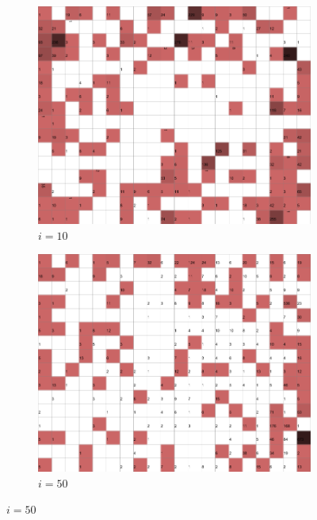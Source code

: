 \documentclass{acm_proc_article-sp}
\begin{document}
\begin{figure}
\centering
    \centering
    \begin{subfigure}[b]{0.24\linewidth}
        \includegraphics[width=\linewidth]{img/wine-newmid-topographic-error-i-10}
        \caption{$i=10$}
        \label{fig:wine-newmid-topographic-error-i-10}
    \end{subfigure}
    \begin{subfigure}[b]{0.24\linewidth}
        \includegraphics[width=\linewidth]{img/wine-newmid-topographic-error-i-50}
        \caption{$i=50$}
        \label{fig:wine-newmid-topographic-error-i-50}

\end{subfigure}
\end{figure}
\end{document}
